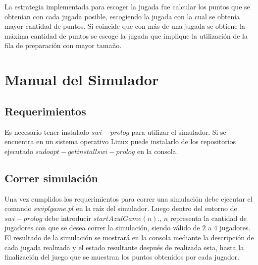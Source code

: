 \documentclass[11pt]{article}
\begin{document}
La estrategia implementada para escoger la jugada fue calcular los puntos que se obtenían con cada jugada posible, escogiendo la jugada con la cual se obtenía mayor cantidad de puntos. Si coincide que con más de una jugada se obtiene la máxima cantidad de puntos se escoge la jugada que implique la utilización de la fila de preparación con mayor tamaño.

\section{Manual del Simulador}

\subsection{Requerimientos}

Es necesario tener instalado $swi-prolog$ para utilizar el simulador. Si se encuentra en un sistema operativo Linux puede instalarlo de los repositorios ejecutado $sudo apt-get install swi-prolog$ en la consola.

\subsection{Correr simulación}

Una vez cumplidos los requerimientos para correr una simulación debe ejecutar el comando $swipl game.pl$ en la raíz del simulador. Luego dentro del entorno de $swi-prolog$ debe introducir $startAzulGame(n).$, $n$ representa la cantidad de jugadores con que se desea correr la simulación, siendo válido de $2$ a $4$ jugadores. El resultado de la simulación se mostrará en la consola mediante la descripción de cada jugada realizada y el estado resultante después de realizada esta, hasta la finalización del juego que se muestran los puntos obtenidos por cada jugador.
\end{document}
